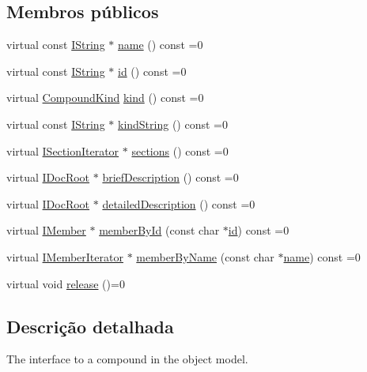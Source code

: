 \subsection*{Membros públicos}
\begin{DoxyCompactItemize}
\item 
virtual const \hyperlink{class_i_string}{I\-String} $\ast$ \hyperlink{class_i_compound_af687440943d0a80c2b38cd5bb51b7a68}{name} () const =0
\item 
virtual const \hyperlink{class_i_string}{I\-String} $\ast$ \hyperlink{class_i_compound_aaba28daa272dce8bc14dde330d5b0126}{id} () const =0
\item 
virtual \hyperlink{class_i_compound_a7063885b1cabbff5f94849960f08ecb2}{Compound\-Kind} \hyperlink{class_i_compound_aee9f3639e2f2fa0f1d9f3729fa8d4d51}{kind} () const =0
\item 
virtual const \hyperlink{class_i_string}{I\-String} $\ast$ \hyperlink{class_i_compound_a872363e5be82229a73bd00d212a703ce}{kind\-String} () const =0
\item 
virtual \hyperlink{class_i_section_iterator}{I\-Section\-Iterator} $\ast$ \hyperlink{class_i_compound_a27ef6c7f6cb888a9b017c06c062a13b5}{sections} () const =0
\item 
virtual \hyperlink{class_i_doc_root}{I\-Doc\-Root} $\ast$ \hyperlink{class_i_compound_a8a0da25a8851dfb809394c4d6585efb2}{brief\-Description} () const =0
\item 
virtual \hyperlink{class_i_doc_root}{I\-Doc\-Root} $\ast$ \hyperlink{class_i_compound_a3fd3d8b278a1e0787d51861984fdc73e}{detailed\-Description} () const =0
\item 
virtual \hyperlink{class_i_member}{I\-Member} $\ast$ \hyperlink{class_i_compound_a222db2d537161310f4b3ed91533b751f}{member\-By\-Id} (const char $\ast$\hyperlink{class_i_compound_aaba28daa272dce8bc14dde330d5b0126}{id}) const =0
\item 
virtual \hyperlink{class_i_member_iterator}{I\-Member\-Iterator} $\ast$ \hyperlink{class_i_compound_a41dab6cd9fd4d21d9f23cd5c11452147}{member\-By\-Name} (const char $\ast$\hyperlink{class_i_compound_af687440943d0a80c2b38cd5bb51b7a68}{name}) const =0
\item 
virtual void \hyperlink{class_i_compound_aab0a52fdd148a54108e7bf49287d7c47}{release} ()=0
\end{DoxyCompactItemize}


\subsection{Descrição detalhada}
The interface to a compound in the object model. 

